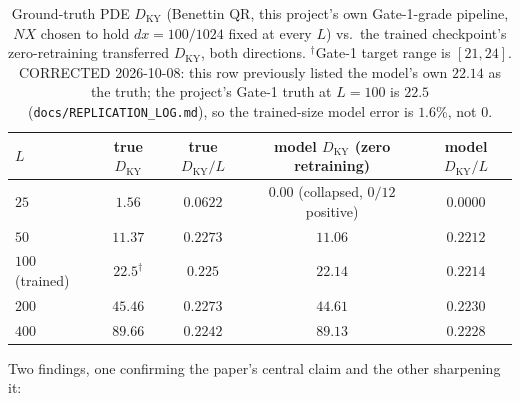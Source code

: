 \documentclass[11pt]{article}
\begin{document}
\begin{table}[h]
\centering
\begin{tabular}{lcccc}
\toprule
$L$ & true $D_{\mathrm{KY}}$ & true $D_{\mathrm{KY}}/L$ & model $D_{\mathrm{KY}}$ (zero retraining) & model $D_{\mathrm{KY}}/L$ \\
\midrule
$25$  & $1.56$  & $0.0622$ & $\mathbf{0.00}$ (collapsed, $0/12$ positive) & $0.0000$ \\
$50$  & $11.37$ & $0.2273$ & $11.06$ & $0.2212$ \\
$100$ (trained) & $22.5^\dagger$ & $0.225$ & $22.14$ & $0.2214$ \\
$200$ & $45.46$ & $0.2273$ & $44.61$ & $0.2230$ \\
$400$ & $89.66$ & $0.2242$ & $89.13$ & $0.2228$ \\
\bottomrule
\end{tabular}
\caption{Ground-truth PDE $D_{\mathrm{KY}}$ (Benettin QR, this project's
own Gate-1-grade pipeline, $NX$ chosen to hold $dx=100/1024$ fixed at
every $L$) vs.\ the trained checkpoint's zero-retraining transferred
$D_{\mathrm{KY}}$, both directions. $^\dagger$Gate-1 target range is
$[21,24]$. CORRECTED 2026-10-08: this row previously listed the model's
own $22.14$ as the truth; the project's Gate-1 truth at $L=100$ is $22.5$
(\texttt{docs/REPLICATION\_LOG.md}), so the trained-size model error is
$1.6\%$, not $0$.}
\label{tab:e1_result}
\end{table}

Two findings, one confirming the paper's central claim and the other
sharpening it:
\end{document}
